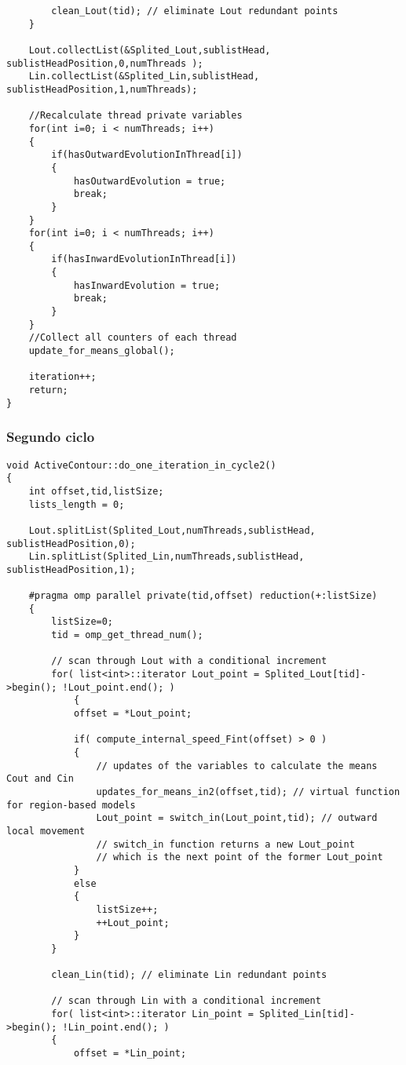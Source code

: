 \begin{appendices}
\begin{lstlisting}
		clean_Lout(tid); // eliminate Lout redundant points
	}
		
	Lout.collectList(&Splited_Lout,sublistHead, sublistHeadPosition,0,numThreads );
	Lin.collectList(&Splited_Lin,sublistHead, sublistHeadPosition,1,numThreads);
	
	//Recalculate thread private variables
	for(int i=0; i < numThreads; i++)
	{
		if(hasOutwardEvolutionInThread[i])
		{
			hasOutwardEvolution = true;
			break;
		}
	}
	for(int i=0; i < numThreads; i++)
	{
		if(hasInwardEvolutionInThread[i])
		{
			hasInwardEvolution = true;
			break;
		}
	}
	//Collect all counters of each thread
	update_for_means_global();
	
	iteration++;
	return;
}
\end{lstlisting}

\subsubsection{Segundo ciclo}


\begin{lstlisting}
void ActiveContour::do_one_iteration_in_cycle2()
{
	int offset,tid,listSize;
	lists_length = 0;
	
	Lout.splitList(Splited_Lout,numThreads,sublistHead, sublistHeadPosition,0);
	Lin.splitList(Splited_Lin,numThreads,sublistHead, sublistHeadPosition,1);
	
	#pragma omp parallel private(tid,offset) reduction(+:listSize)
	{
		listSize=0;
		tid = omp_get_thread_num();
		
		// scan through Lout with a conditional increment
		for( list<int>::iterator Lout_point = Splited_Lout[tid]->begin(); !Lout_point.end(); )
			{
			offset = *Lout_point;
			
			if( compute_internal_speed_Fint(offset) > 0 )
			{
				// updates of the variables to calculate the means Cout and Cin
				updates_for_means_in2(offset,tid); // virtual function for region-based models
				Lout_point = switch_in(Lout_point,tid); // outward local movement
				// switch_in function returns a new Lout_point
				// which is the next point of the former Lout_point
			}
			else
			{
				listSize++;
				++Lout_point;
			}
		}
		
		clean_Lin(tid); // eliminate Lin redundant points
		
		// scan through Lin with a conditional increment
		for( list<int>::iterator Lin_point = Splited_Lin[tid]->begin(); !Lin_point.end(); )
		{
			offset = *Lin_point;
			

\end{lstlisting}
\end{appendices}

